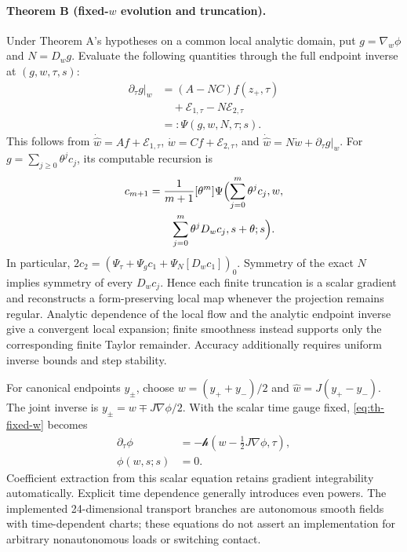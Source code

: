 \paragraph{Theorem B (fixed-$w$ evolution and truncation).}\label{thm:fixed-w}
Under Theorem A's hypotheses on a common local analytic domain, put $g=\nabla_w\phi$ and $N=D_wg$. Evaluate the following quantities through the full endpoint inverse at $(g,w,\tau,s)$:
\begin{equation}
 \begin{aligned}
 \left.\partial_\tau g\right|_w
 &=(A-NC)f(z_+,\tau)\\
 &\quad+\mathcal E_{1,\tau}-N\mathcal E_{2,\tau}\\
 &=:\Psi(g,w,N,\tau;s).
\end{aligned}
 \label{eq:th-fixed-w}
\end{equation}
This follows from $\dot{\widehat w}=A f+\mathcal E_{1,\tau}$, $\dot w=Cf+\mathcal E_{2,\tau}$, and $\dot{\widehat w}=N\dot w+\partial_\tau g|_w$. For $g=\sum_{j\ge0}\theta^jc_j$, its computable recursion is
\begin{equation}
 \begin{aligned}
 c_{m+1}&=\frac1{m+1}[\theta^m]\Psi\Bigl(
 \sum_{j=0}^m\theta^jc_j,w,\\
 &\hspace{2em}\sum_{j=0}^m\theta^jD_wc_j,s+\theta;s\Bigr).
\end{aligned}
 \label{eq:th-fixed-recursion}
\end{equation}
In particular, $2c_2=(\Psi_\tau+\Psi_g c_1+\Psi_N[D_wc_1])_0$. Symmetry of the exact $N$ implies symmetry of every $D_wc_j$. Hence each finite truncation is a scalar gradient and reconstructs a form-preserving local map whenever the projection remains regular. Analytic dependence of the local flow and the analytic endpoint inverse give a convergent local expansion; finite smoothness instead supports only the corresponding finite Taylor remainder. Accuracy additionally requires uniform inverse bounds and step stability.

For canonical endpoints $y_\pm$, choose $w=(y_++y_-)/2$ and $\widehat w=J(y_+-y_-)$. The joint inverse is $y_\pm=w\mp J\nabla\phi/2$. With the scalar time gauge fixed, \eqref{eq:th-fixed-w} becomes
\begin{equation}
 \begin{aligned}
 \partial_\tau\phi&=-\mathcal h\left(w-\tfrac12J\nabla\phi,\tau\right),\\
 \phi(w,s;s)&=0.
\end{aligned}
 \label{eq:th-central-pde}
\end{equation}
Coefficient extraction from this scalar equation retains gradient integrability automatically. Explicit time dependence generally introduces even powers. The implemented 24-dimensional transport branches are autonomous smooth fields with time-dependent charts; these equations do not assert an implementation for arbitrary nonautonomous loads or switching contact.

